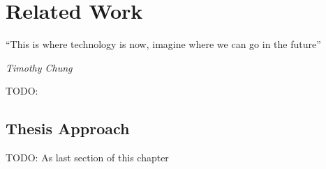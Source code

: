 \chapter{Related Work} %
\label{chap:Chapter3}       %
\epigraph{``This is where technology is now, imagine where we can go in the future” }{\textit{Timothy Chung}}

TODO:

\section{Thesis Approach}
TODO: As last section of this chapter
